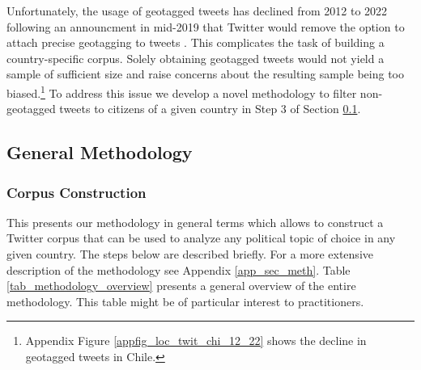         \newline\indent
    Unfortunately, the usage of geotagged tweets has declined from 2012 to 2022 following an announcment in mid-2019 that Twitter would remove the option to attach precise geotagging to tweets \citep{kruspe_changes_2021}. This complicates the task of building a country-specific corpus. Solely obtaining geotagged tweets would not yield a sample of sufficient size and raise concerns about the resulting sample being too biased.\footnote{Appendix Figure \ref{appfig_loc_twit_chi_12_22} shows the decline in geotagged tweets in Chile.} To address this issue we develop a novel methodology to filter non-geotagged tweets to citizens of a given country in Step 3 of Section \ref{sec_meth_gene}.
    


    \subsection{General Methodology}\label{sec_meth_gene}
    
    \subsubsection{Corpus Construction}\label{sec_meth_corp}
        This presents our methodology in general terms which allows to construct a Twitter corpus that can be used to analyze any political topic of choice in any given country. The steps below are described briefly. For a more extensive description of the methodology see Appendix \ref{app_sec_meth}. Table \ref{tab_methodology_overview} presents a general overview of the entire methodology. This table might be of particular interest to practitioners.
        
            
            
            
        
